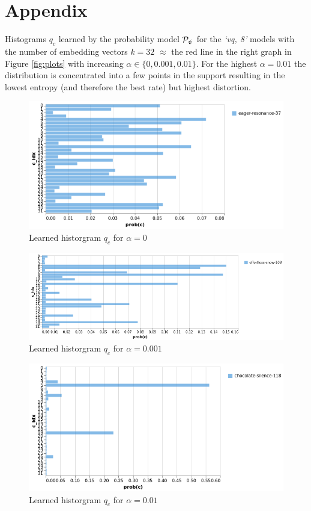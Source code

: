 \documentclass{article} %
\newcommand{\qc}{q_c}
\newcommand{\gPp}{\gP_{\psi}}
\begin{document}



\appendix
\section{Appendix}

Histograms $\qc$ learned by the probability model $\gPp$ for the \emph{`vq, 8'} models with the number of embedding vectors $k=32$ $\approx$ the red line in the right graph in Figure \ref{fig:plots} with increasing $\alpha \in \{0, 0.001, 0.01\}$.
For the highest $\alpha = 0.01$ the distribution is concentrated into a few points in the support resulting in the lowest entropy (and therefore the best rate) but highest distortion.

\begin{figure}[h]
\begin{center}
\includegraphics[scale=0.5]{pics/hist_vq8_k32_alpha0.png}
\end{center}
\caption{Learned historgram $\qc$ for $\alpha = 0$}
\end{figure}
\begin{figure}[h]
\begin{center}
\includegraphics[scale=0.5]{pics/hist_vq8_k32_alpha0_001.png}
\end{center}
\caption{Learned historgram $\qc$ for $\alpha = 0.001$}
\end{figure}
\begin{figure}[h]
\begin{center}
\includegraphics[scale=0.5]{pics/hist_vq8_k32_alpha0_01.png}
\end{center}
\caption{Learned historgram $\qc$ for $\alpha = 0.01$}
\end{figure}
\end{document}
